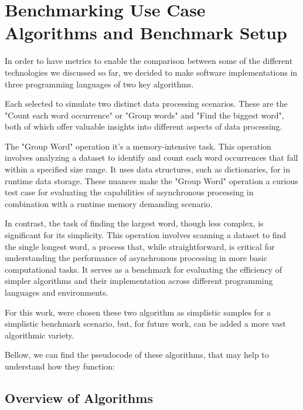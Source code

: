 

\lstset{basicstyle=\small\ttfamily, breaklines=true, frame=single}
\chapter{Benchmarking Use Case Algorithms and Benchmark Setup}
\label{cha:benchmarking_use_case_algorithms}

In order to have metrics to enable the comparison between some of the different technologies we discussed so far, we decided to make software implementations in three programming languages of two key algorithms. 

Each selected to simulate two distinct data processing scenarios. These are the "Count each word occurrence" or "Group words" and "Find the biggest word", both of which offer valuable insights into different aspects of data processing.

The "Group Word" operation it's a memory-intensive task. This operation involves analyzing a dataset to identify and count each word occurrences that fall within a specified size range. It uses data structures, such as dictionaries, for in runtime data storage. These nuances make the "Group Word" operation a curious test case for evaluating the capabilities of asynchronous processing in combination with a runtime memory demanding scenario.

In contrast, the task of finding the largest word, though less complex, is significant for its simplicity. This operation involves scanning a dataset to find the single longest word, a process that, while straightforward, is critical for understanding the performance of asynchronous processing in more basic computational tasks. It serves as a benchmark for evaluating the efficiency of simpler algorithms and their implementation across different programming languages and environments.

For this work, were chosen these two algorithm as simplistic samples for a simplistic benchmark scenario, but, for future work, can be added a more vast algorithmic variety.

Bellow, we can find the pseudocode of these algorithms, that may help to understand how they function:


\section{Overview of Algorithms}
\label{sec:algorithm_overview}


